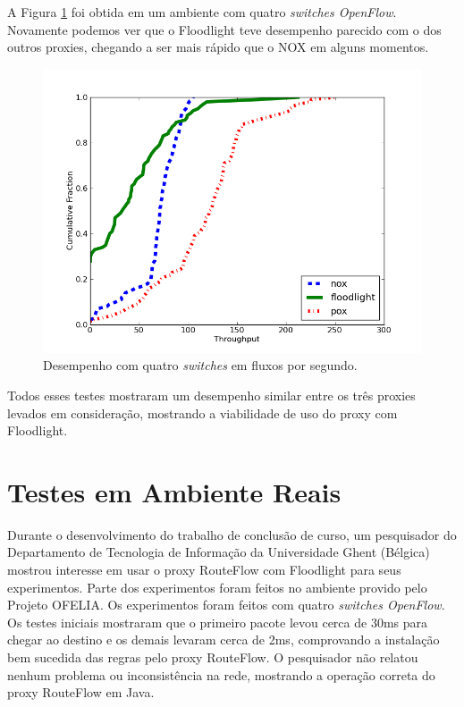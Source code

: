 A Figura \ref{fig:desempenho4sw} foi obtida em um ambiente
com quatro \textit{switches OpenFlow}. Novamente podemos
ver que o Floodlight teve desempenho parecido com o dos
outros proxies, chegando a ser mais rápido que o NOX em 
alguns momentos.


\begin{figure}[h]
\centering
\includegraphics[width=140mm]{desempenho_4sw.png}
\caption{Desempenho com quatro \textit{switches} em fluxos por segundo.}
\label{fig:desempenho4sw} 
\end{figure}

Todos esses testes mostraram um desempenho similar entre
os três proxies levados em consideração, mostrando a viabilidade
de uso do proxy com Floodlight.

\section{Testes em Ambiente Reais}

Durante o desenvolvimento do trabalho de conclusão de
curso, um pesquisador do Departamento de Tecnologia de
Informação da Universidade Ghent (Bélgica) mostrou interesse
em usar o proxy RouteFlow com Floodlight para seus
experimentos. Parte dos experimentos foram feitos no ambiente
provido pelo Projeto OFELIA. Os experimentos
foram feitos com quatro \textit{switches OpenFlow}. Os testes
iniciais mostraram que o primeiro pacote levou cerca de 30ms
para chegar ao destino e os demais levaram cerca de
2ms, comprovando a instalação bem sucedida das regras pelo
proxy RouteFlow. O pesquisador não relatou nenhum 
problema ou inconsistência na rede, mostrando a operação
correta do proxy RouteFlow em Java.




